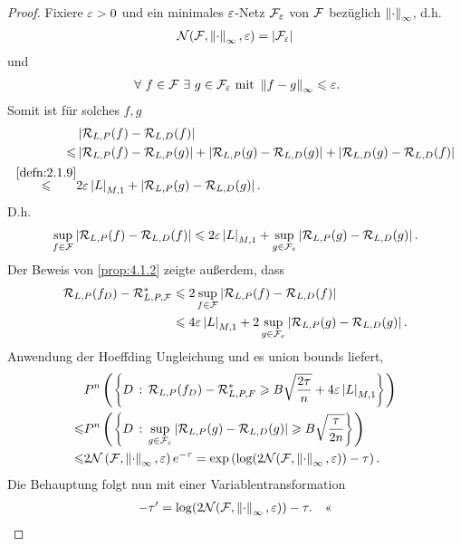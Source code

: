 \begin{proof}
Fixiere $\varepsilon > 0$ und ein minimales $\varepsilon$-Netz $\mathcal{F}_\varepsilon$ von $\mathcal{F}$ bezüglich
$\left\|\cdot\right\|_\infty$, d.h.
\begin{align*}
\mathcal{N}(\mathcal{F},\left\|\cdot\right\|_\infty,\varepsilon) = \left|\mathcal{F}_\varepsilon\right|
\end{align*}
und
\begin{align*}
\forall f\in\FF \exists g\in \FF_\ep \text{ mit } \norm{f-g}_\infty \le \ep.
\end{align*}
Somit ist für solches $f,g$
\begin{align*}
&\left|\mathcal{R}_{L,P}(f)-\mathcal{R}_{L,D}(f)\right|\\
\leqslant &\left|\mathcal{R}_{L,P}(f)-\mathcal{R}_{L,P}(g)\right|
+ \left|\mathcal{R}_{L,P}(g)-\mathcal{R}_{L,D}(g)\right|
+ \left|\mathcal{R}_{L,D}(g)-\mathcal{R}_{L,D}(f)\right|\\
\overset{\ref{defn:2.1.9}}{\leqslant} &2 \varepsilon \left|L\right|_{M,1} + 
\left|\mathcal{R}_{L,P}(g)-\mathcal{R}_{L,D}(g)\right|.
\end{align*}
D.h.
\begin{align*}
\sup_{f\in\mathcal{F}} \left|\mathcal{R}_{L,P}(f)-\mathcal{R}_{L,D}(f)\right|
\leqslant 2\varepsilon \left|L\right|_{M,1} + 
\sup_{g\in\mathcal{F}_\varepsilon}\left|\mathcal{R}_{L,P}(g)-\mathcal{R}_{L,D}(g)\right|.
\end{align*}
Der Beweis von \ref{prop:4.1.2} zeigte außerdem, dass
\begin{align*}
\mathcal{R}_{L,P}(f_D)-\mathcal{R}_{L,P,\mathcal{F}}^*
&\leqslant 2 \sup_{f\in\mathcal{F}} \left|\mathcal{R}_{L,P}(f)-\mathcal{R}_{L,D}(f)\right|\\
&\leqslant 4\varepsilon \left|L\right|_{M,1} + 2
\sup_{g\in\mathcal{F}_\varepsilon} \left|\mathcal{R}_{L,P}(g)-\mathcal{R}_{L,D}(g)\right|. 
\end{align*}
Anwendung der Hoeffding Ungleichung und es union bounds liefert, 
\begin{align*}
&P^n\left(\left\{ D\,:\,\mathcal{R}_{L,P}(f_D)-\mathcal{R}_{L,P,F}^*\geqslant B\sqrt{\frac{2\tau}{n}}+
4\varepsilon \left|L\right|_{M,1}\right\} \right)\\
\leqslant &P^n\left( \left\{ D\,:\,\sup_{g\in\mathcal{F}_\varepsilon} \left|\mathcal{R}_{L,P}(g) -
\mathcal{R}_{L,D}(g)\right|\geqslant B\sqrt{\frac{\tau}{2n}}\right\} \right)\\
\leqslant &2\mathcal{N}\left(\mathcal{F},\left\|\cdot\right\|_\infty,\varepsilon \right)e^{-\tau}
= \exp\left(\log(2 \mathcal{N}(\mathcal{F},\left\|\cdot\right\|_\infty, \varepsilon))-\tau \right).
\end{align*}
Die Behauptung folgt nun mit einer Variablentransformation
\begin{align*}
-\tau' = \log(2
\mathcal{N}(\mathcal{F},\left\|\cdot\right\|_\infty, \varepsilon))-\tau.\quad\text{<<}
\end{align*}
\end{proof}